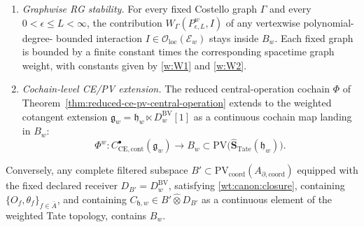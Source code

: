 \begin{thm}
\begin{enumerate}[label=(\alph*)]
      $C_{\mathfrak h,w}$ is counterterm-free; it is the fixed
      Mittag-Leffler kernel of \ref{wt:canon:casimir}.  The
      renormalized endpoint and the mixed brane-defect QME counterterm
      tower are the separate data of
      Problem~\ref{prob:weighted-rg-locality}.
    \item\label{wt:canon:rg}
      \emph{Graphwise RG stability.} For every fixed Costello graph
      $\Gamma$ and every $0<\epsilon\leq L<\infty$, the contribution
      $W_\Gamma(P^w_{\epsilon,L},I)$ of any vertexwise polynomial-degree-
      bounded interaction
      $I\in\mathcal O_{\mathrm{loc}}(\mathcal E_w)$ stays inside $B_w$.
      Each fixed graph is bounded by a finite constant times the
      corresponding spacetime graph weight, with constants given by
      \ref{w:W1} and \ref{w:W2}.
    \item\label{wt:canon:phi}
      \emph{Cochain-level CE/PV extension.} The reduced central-operation
      cochain $\Phi$ of
      Theorem~\ref{thm:reduced-ce-pv-central-operation} extends to the
      weighted cotangent extension
      $\mathfrak g_w=\mathfrak h_w\ltimes D^{\mathrm{BV}}_w[1]$
      as a continuous cochain map landing in $B_w$:
      \[
        \Phi^w\colon
        C^\bullet_{\mathrm{CE},\mathrm{cont}}(\mathfrak g_w)
        \longrightarrow B_w\subset
          \mathrm{PV}\bigl(\widehat{\mathbf S}_{\mathrm{Tate}}
          (\mathfrak h_w)\bigr).
      \]
  \end{enumerate}

  Conversely, any complete filtered subspace
  $B'\subset\mathrm{PV}_{\mathrm{coord}}(A_{\partial,\mathrm{coord}})$
  equipped with the fixed declared receiver
  \(D_{B'}=D^{\mathrm{BV}}_w\),
  satisfying \ref{wt:canon:closure}, containing
  $\{O_f,\theta_f\}_{f\in\bar A}$, and containing
  \(C_{\mathfrak h,w}\in B'\widehat\otimes D_{B'}\) as a continuous
  element of the weighted Tate topology, contains \(B_w\).
\end{thm}

